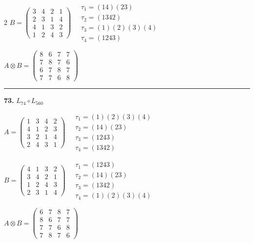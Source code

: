 \begin{multicols}{2}
$B = \begin{pmatrix} 3 & 4 & 2 & 1 \\ 2 & 3 & 1 & 4 \\ 4 & 1 & 3 & 2 \\ 1 & 2 & 4 & 3 \end{pmatrix} \quad \begin{matrix} \tau_{1}=(1 4)(2 3) \\ \tau_{2}=(1 3 4 2) \\ \tau_{3}=(1)(2)(3)(4) \\ \tau_{4}=(1 2 4 3) \end{matrix}$

$A \otimes B = \begin{pmatrix} 8 & 6 & 7 & 7 \\ 7 & 8 & 7 & 6 \\ 6 & 7 & 8 & 7 \\ 7 & 7 & 6 & 8 \end{pmatrix}$

\vspace{0.3em}
\hrule
\vspace{0.3em}

\noindent\textbf{73.} $L_{74} \circ L_{560}$

$A = \begin{pmatrix} 1 & 3 & 4 & 2 \\ 4 & 1 & 2 & 3 \\ 3 & 2 & 1 & 4 \\ 2 & 4 & 3 & 1 \end{pmatrix} \quad \begin{matrix} \tau_{1}=(1)(2)(3)(4) \\ \tau_{2}=(1 4)(2 3) \\ \tau_{3}=(1 2 4 3) \\ \tau_{4}=(1 3 4 2) \end{matrix}$

$B = \begin{pmatrix} 4 & 1 & 3 & 2 \\ 3 & 4 & 2 & 1 \\ 1 & 2 & 4 & 3 \\ 2 & 3 & 1 & 4 \end{pmatrix} \quad \begin{matrix} \tau_{1}=(1 2 4 3) \\ \tau_{2}=(1 4)(2 3) \\ \tau_{3}=(1 3 4 2) \\ \tau_{4}=(1)(2)(3)(4) \end{matrix}$

$A \otimes B = \begin{pmatrix} 6 & 7 & 8 & 7 \\ 8 & 6 & 7 & 7 \\ 7 & 7 & 6 & 8 \\ 7 & 8 & 7 & 6 \end{pmatrix}$


\end{multicols}

